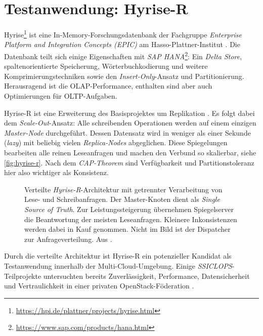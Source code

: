 \section{Testanwendung: Hyrise-R}
\label{sec:hyrise-r}

Hyrise\footnote{\url{https://hpi.de/plattner/projects/hyrise.html}} ist eine In-Memory-Forschungsdatenbank der Fachgruppe \emph{Enterprise Platform and Integration Concepts (EPIC)} am Hasso-Plattner-Institut \cite{grund:2010:hyrise}. Die Datenbank teilt sich einige Eigenschaften mit \emph{SAP HANA}\footnote{\url{https://www.sap.com/products/hana.html}}: Ein \emph{Delta Store}, spaltenorientierte Speicherung, Wörterbuchkodierung und weitere Komprimierungstechniken sowie den \emph{Insert-Only}-Ansatz und Partitionierung. Herausragend ist die OLAP-Performance, enthalten sind aber auch Optimierungen für OLTP-Aufgaben.

Hyrise-R ist eine Erweiterung des Basisprojektes um Replikation \cite{schwalb:2015:hyrise-r}. Es folgt dabei dem \emph{Scale-Out}-Ansatz: Alle schreibenden Operationen werden auf einem einzigen \emph{Master-Node} durchgeführt. Dessen Datensatz wird in weniger als einer Sekunde (\emph{lazy}) mit beliebig vielen \emph{Replica-Nodes} abgeglichen. Diese Spiegelungen bearbeiten alle reinen Leseanfragen und machen den Verbund so skalierbar, siehe \autoref{fig:hyrise-r}. Nach dem \emph{CAP-Theorem} sind Verfügbarkeit und Partitionstoleranz hier also wichtiger als Konsistenz. 

\begin{figure}[ht]
	\centering
	\def\svgwidth{0.9\textwidth}
	\textsf{
	}
	\caption{Verteilte \emph{Hyrise-R}-Architektur mit getrennter Verarbeitung von Lese- und Schreibanfragen. Der Master-Knoten dient als \emph{Single Source of Truth}. Zur Leistungssteigerung übernehmen Spiegelserver die Beantwortung der meisten Leseanfragen. Kleinere Inkonsistenzen werden dabei in Kauf genommen. Nicht im Bild ist der Dispatcher zur Anfrageverteilung. Aus \cite{ssiclops:d42:experiments-measurements}.}	
	\label{fig:hyrise-r}
\end{figure}

Durch die verteilte Architektur ist Hyrise-R ein potenzieller Kandidat als Testanwendung innerhalb der Multi-Cloud-Umgebung. Einige \emph{SSICLOPS}-Teilprojekte untersuchten bereits Zuverlässigkeit, Performance, Datensicherheit und Vertraulichkeit in einer privaten OpenStack-Föderation \cite{ssiclops:d23:security-extensions, ssiclops:d42:experiments-measurements, bastian:2017:openstack-policies}.

